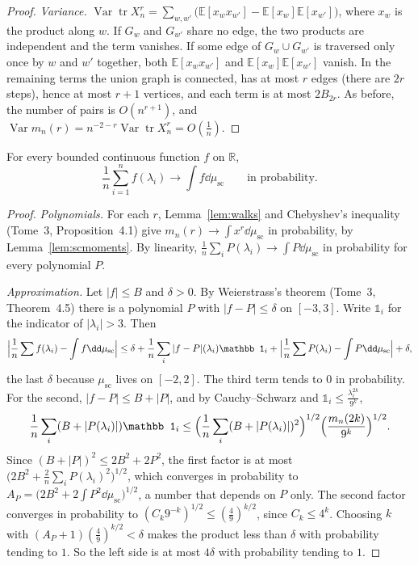 \begin{proof}
\emph{Variance.} $\operatorname{Var}\operatorname{tr}X_n^r=\sum_{w,w'}\bigl(\mathbb E[x_wx_{w'}]-\mathbb E[x_w]\mathbb E[x_{w'}]\bigr)$, where $x_w$ is the product along $w$. If
$G_w$ and $G_{w'}$ share no edge, the two products are independent and the term vanishes. If some edge of $G_w\cup G_{w'}$ is traversed only once by $w$ and
$w'$ together, both $\mathbb E[x_wx_{w'}]$ and $\mathbb E[x_w]\mathbb E[x_{w'}]$ vanish. In the remaining terms the union graph is connected, has at most $r$ edges
(there are $2r$ steps), hence at most $r+1$ vertices, and each term is at most $2B_{2r}$. As before, the number of pairs is $O(n^{r+1})$, and
$\operatorname{Var}m_n(r)=n^{-2-r}\operatorname{Var}\operatorname{tr}X_n^r=O(\frac1n)$.
\end{proof}

\begin{theorem}[Wigner, 1955]\label{thm:wigner}
For every bounded continuous function $f$ on $\mathbb R$,
\[
\frac1n\sum_{i=1}^nf(\lambda_i)\longrightarrow\int f\dd\mu_{\mathrm{sc}}\qquad\text{in probability.}
\]
\end{theorem}
\begin{proof}
\emph{Polynomials.} For each $r$, Lemma~\ref{lem:walks} and Chebyshev's inequality (Tome~3, Proposition~4.1) give $m_n(r)\to\int x^r\dd\mu_{\mathrm{sc}}$ in
probability, by Lemma~\ref{lem:scmoments}. By linearity, $\frac1n\sum_iP(\lambda_i)\to\int P\dd\mu_{\mathrm{sc}}$ in probability for every polynomial $P$.

\emph{Approximation.} Let $|f|\le B$ and $\delta>0$. By Weierstrass's theorem (Tome~3, Theorem~4.5) there is a polynomial $P$ with $|f-P|\le\delta$ on $[-3,3]$.
Write $\mathbb 1_i$ for the indicator of $|\lambda_i|>3$. Then
\[
\Bigl|\frac1n\sum f(\lambda_i)-\int f\dd\mu_{\mathrm{sc}}\Bigr|\le\delta+\frac1n\sum_i|f-P|(\lambda_i)\mathbb 1_i+\Bigl|\frac1n\sum P(\lambda_i)-\int P\dd\mu_{\mathrm{sc}}\Bigr|+\delta,
\]
the last $\delta$ because $\mu_{\mathrm{sc}}$ lives on $[-2,2]$. The third term tends to $0$ in probability. For the second, $|f-P|\le B+|P|$, and by
Cauchy--Schwarz and $\mathbb 1_i\le\frac{\lambda_i^{2k}}{9^k}$,
\[
\frac1n\sum_i(B+|P(\lambda_i)|)\mathbb 1_i\le\Bigl(\frac1n\sum_i(B+|P(\lambda_i)|)^2\Bigr)^{1/2}\Bigl(\frac{m_n(2k)}{9^k}\Bigr)^{1/2}.
\]
Since $(B+|P|)^2\le2B^2+2P^2$, the first factor is at most $\bigl(2B^2+\frac2n\sum_iP(\lambda_i)^2\bigr)^{1/2}$, which converges in probability to
$A_P=\bigl(2B^2+2\int P^2\dd\mu_{\mathrm{sc}}\bigr)^{1/2}$, a number that depends on $P$ only. The second factor converges in probability to $(C_k9^{-k})^{1/2}\le(\frac49)^{k/2}$,
since $C_k\le4^k$. Choosing $k$ with $(A_P+1)(\frac49)^{k/2}<\delta$ makes the product less than $\delta$ with probability tending to $1$.
So the left side is at most $4\delta$ with probability tending to $1$.
\end{proof}

